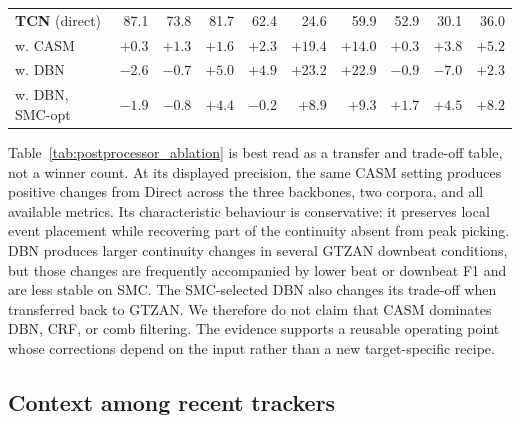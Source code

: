 \documentclass{article}
\begin{document}
\begin{table}[t]
{\begin{tabular}{l|rrr|rrr|rrr}
\midrule
\textbf{TCN} (direct) \cite{bock2020deconstruct}
& 87.1 & 73.8 & 81.7
& 62.4 & 24.6 & 59.9
& 52.9 & 30.1 & 36.0 \\
\rowcolor{gray!10}
\quad w. CASM
& $\mathbf{+0.3}$ & $\mathbf{+1.3}$ & $+1.6$
& $+2.3$ & $+19.4$ & $+14.0$
& $+0.3$ & $+3.8$ & $+5.2$ \\
\quad w. DBN
& $-2.6$ & $-0.7$ & $\mathbf{+5.0}$
& $\mathbf{+4.9}$ & $\mathbf{+23.2}$ & $\mathbf{+22.9}$
& $-0.9$ & $-7.0$ & $+2.3$ \\
\rowcolor{gray!10}
\quad w. DBN, SMC-opt
& $-1.9$ & $-0.8$ & $+4.4$
& $-0.2$ & $+8.9$ & $+9.3$
& $\mathbf{+1.7}$ & $\mathbf{+4.5}$ & $\mathbf{+8.2}$ \\
\bottomrule
\end{tabular}%
}
\endgroup
\end{table}

Table~\ref{tab:postprocessor_ablation} is best read as a transfer and
trade-off table, not a winner count. At its displayed precision, the same
CASM setting produces positive changes from Direct across the three
backbones, two corpora, and all available metrics. Its characteristic
behaviour is conservative: it preserves local event placement while recovering
part of the continuity absent from peak picking. DBN produces larger
continuity changes in several GTZAN downbeat conditions, but those changes are
frequently accompanied by lower beat or downbeat F1 and are less stable on
SMC. The SMC-selected DBN also changes its trade-off when transferred back to
GTZAN. We therefore do not claim that CASM dominates DBN, CRF, or comb
filtering. The evidence supports a reusable operating point whose corrections
depend on the input rather than a new target-specific recipe.

\subsection{Context among recent trackers}
\end{document}
